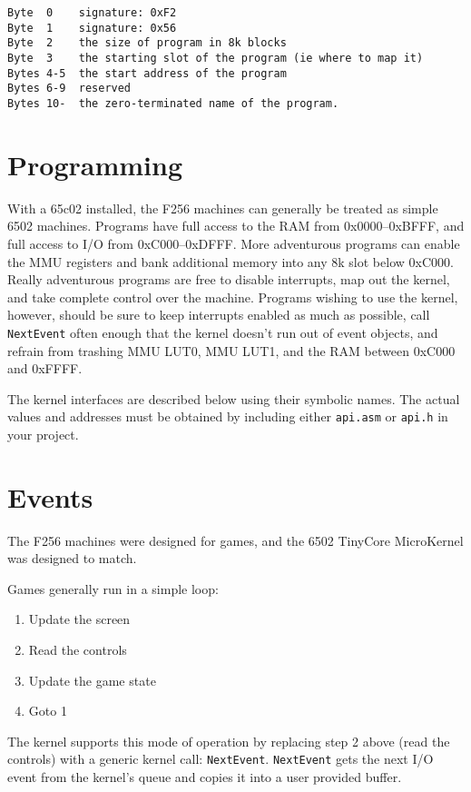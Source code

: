 \begin{verbatim}
Byte  0    signature: 0xF2
Byte  1    signature: 0x56
Byte  2    the size of program in 8k blocks
Byte  3    the starting slot of the program (ie where to map it)
Bytes 4-5  the start address of the program
Bytes 6-9  reserved
Bytes 10-  the zero-terminated name of the program.
\end{verbatim}

\section*{Programming}
With a 65c02 installed, the F256 machines can generally be treated as simple 6502 machines.  Programs have full access to the RAM from 0x0000--0xBFFF, and full access to I/O from 0xC000--0xDFFF.  More adventurous programs can enable the MMU registers and bank additional memory into any 8k slot below 0xC000.  Really adventurous programs are free to disable interrupts, map out the kernel, and take complete control over the machine.  Programs wishing to use the kernel, however, should be sure to keep interrupts enabled as much as possible, call \verb+NextEvent+ often enough that the kernel doesn't run out of event objects, and refrain from trashing MMU LUT0, MMU LUT1, and the RAM between 0xC000 and 0xFFFF.

The kernel interfaces are described below using their symbolic names.  The actual values and addresses must be obtained by including either \verb+api.asm+ or \verb+api.h+ in your project.

\section*{Events}
The F256 machines were designed for games, and the 6502 TinyCore MicroKernel was designed to match.

Games generally run in a simple loop:

\begin{enumerate}
    \item Update the screen
    \item Read the controls
    \item Update the game state
    \item Goto 1
\end{enumerate}

The kernel supports this mode of operation by replacing step 2 above (read the controls) with a generic kernel call: \verb+NextEvent+.  \verb+NextEvent+ gets the next I/O event from the kernel's queue and copies it into a user provided buffer.  

